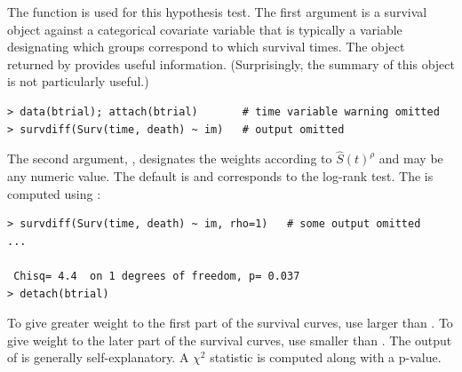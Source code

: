 \documentclass[11pt]{article}
\begin{document}
The function  is used for this hypothesis test. The first argument is a survival object against a categorical covariate variable that is typically a variable designating which groups correspond to which survival times. The object returned by  provides useful information. (Surprisingly, the summary of this object is not particularly useful.)
{\color{verbatimrcom}\begin{verbatim}
> data(btrial); attach(btrial)       # time variable warning omitted
> survdiff(Surv(time, death) ~ im)   # output omitted
\end{verbatim}}
The second  argument, , designates the weights according to $\hat{S}(t)^\rho$ and may be any numeric value. The default is  and corresponds to the log-rank test. The  is computed using :
{\color{verbatimrcom}\begin{verbatim}
> survdiff(Surv(time, death) ~ im, rho=1)   # some output omitted
...

 Chisq= 4.4  on 1 degrees of freedom, p= 0.037 
> detach(btrial)
\end{verbatim}}
To give greater weight to the first part of the survival curves, use  larger than . To give weight to the later part of the survival curves, use  smaller than . The output of  is generally self-explanatory. A $\chi^2$ statistic is computed along with a p-value.

\pagebreak

{} \vspace{-1mm} \par
{}
\label{coxPHConstCov}
\end{document}
